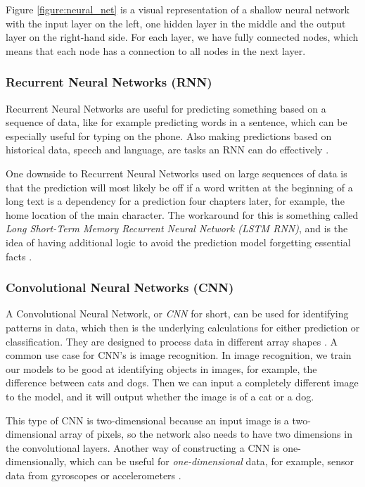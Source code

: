 Figure \ref{figure:neural_net} is a visual representation of a shallow neural network with the input layer on the left, one hidden layer in the middle and the output layer on the right-hand side. For each layer, we have fully connected nodes, which means that each node has a connection to all nodes in the next layer.

\subsubsection{Recurrent Neural Networks (RNN)}
Recurrent Neural Networks are useful for predicting something based on a sequence of data, like for example predicting words in a sentence, which can be especially useful for typing on the phone. Also making predictions based on historical data, speech and language, are tasks an RNN can do effectively \cite{deep_learning}.

One downside to Recurrent Neural Networks used on large sequences of data is that the prediction will most likely be off if a word written at the beginning of a long text is a dependency for a prediction four chapters later, for example, the home location of the main character. The workaround for this is something called \textit{Long Short-Term Memory Recurrent Neural Network (LSTM RNN)}, and is the idea of having additional logic to avoid the prediction model forgetting essential facts \cite{deep_learning}.

\subsubsection{Convolutional Neural Networks (CNN)}
A Convolutional Neural Network, or \textit{CNN} for short, can be used for identifying patterns in data, which then is the underlying calculations for either prediction or classification. They are designed to process data in different array shapes \cite{deep_learning}. A common use case for CNN's is image recognition. In image recognition, we train our models to be good at identifying objects in images, for example, the difference between cats and dogs. Then we can input a completely different image to the model, and it will output whether the image is of a cat or a dog. 

This type of CNN is two-dimensional because an input image is a two-dimensional array of pixels, so the network also needs to have two dimensions in the convolutional layers. Another way of constructing a CNN is one-dimensionally, which can be useful for \textit{one-dimensional} data, for example, sensor data from gyroscopes or accelerometers \cite{deep_learning}.


